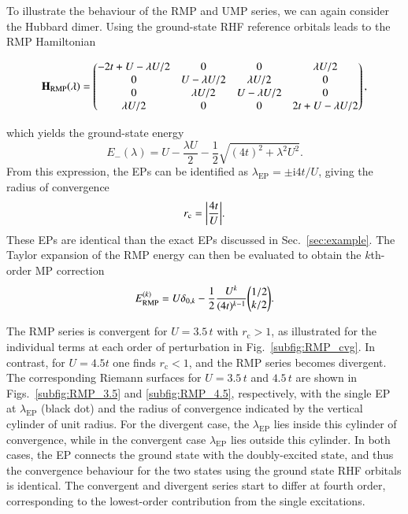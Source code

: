\documentclass[aps,prb,reprint,noshowkeys,linenumbers,superscriptaddress]{revtex4-1}
\newcommand{\bH}{\mathbf{H}}
\renewcommand{\i}{\mathrm{i}} %
\newcommand{\rc}{r_{\text{c}}}
\newcommand{\lep}{\lambda_{\text{EP}}}
\begin{document}
To illustrate the behaviour of the RMP and UMP series, we can again consider the Hubbard dimer.
Using the ground-state RHF reference orbitals leads to the RMP Hamiltonian
\begin{widetext}
\begin{equation}
\label{eq:H_RMP}
\bH_\text{RMP}\qty(\lambda) = 
	\begin{pmatrix}
		-2t + U - \lambda U/2	&	0					&	0					&	\lambda U/2	\\
		0						&	U - \lambda U/2 	&	\lambda U/2			&	0	\\
		0						&	\lambda U/2			&	U - \lambda U/2 	&	0	\\
		\lambda U/2 			&	0 					&	0					&	2t + U - \lambda U/2	\\
	\end{pmatrix},
\end{equation}
\end{widetext}
which yields the ground-state energy 
\begin{equation}
	\label{eq:E0MP}
	E_{-}(\lambda) = U - \frac{\lambda U}{2} - \frac{1}{2} \sqrt{(4t)^2 + \lambda ^2 U^2}.
\end{equation}
From this expression, the EPs can be identified as $\lep = \pm \i 4t / U$,
giving the radius of convergence
\begin{equation}
    \rc = \abs{\frac{4t}{U}}.
\end{equation}
These EPs are identical than the exact EPs discussed in Sec.~\ref{sec:example}.
The Taylor expansion of the RMP energy can then be evaluated to obtain the $k$th-order MP correction
\begin{equation}
	E_\text{RMP}^{(k)} = U \delta_{0,k} - \frac{1}{2} \frac{U^k}{(4t)^{k-1}} \mqty( 1/2 \\ k/2).
\end{equation}

The RMP series is convergent for $U = 3.5\,t$ with $\rc > 1$, as illustrated for the individual terms at each order
of perturbation in Fig.~\ref{subfig:RMP_cvg}.
In contrast, for $U = 4.5t$ one finds $\rc < 1$, and the RMP series becomes divergent.
The corresponding Riemann surfaces for $U = 3.5\,t$ and $4.5\,t$ are shown in Figs.~\ref{subfig:RMP_3.5} and 
\ref{subfig:RMP_4.5}, respectively, with the single EP at $\lep$ (black dot) and the radius of convergence indicated
by the vertical cylinder of unit radius.
For the divergent case, the $\lep$ lies inside this cylinder of convergence, while in the convergent case $\lep$ lies
outside this cylinder.
In both cases, the EP connects the ground state with the doubly-excited state, and thus the convergence behaviour
for the two states using the ground state RHF orbitals is identical.
The convergent and divergent series start to differ at fourth order, corresponding to the lowest-order contribution
from the single excitations.\cite{Lepetit_1988}
\end{document}
